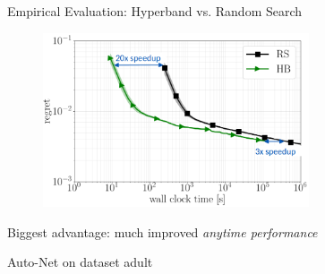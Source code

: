     


    


\begin{frame}{Empirical Evaluation: Hyperband vs. Random Search}

\vskip -10pt
\hskip 270pt

\begin{figure}
    \centering
    \includegraphics[width=0.7\textwidth]{w07_hpo_grey_box/images/hyperband/bohb_2.png}
\end{figure}

\begin{center}
    Biggest advantage: much improved \emph{anytime performance}
    
    \tiny{Auto-Net on dataset adult}
\end{center}

\end{frame}

